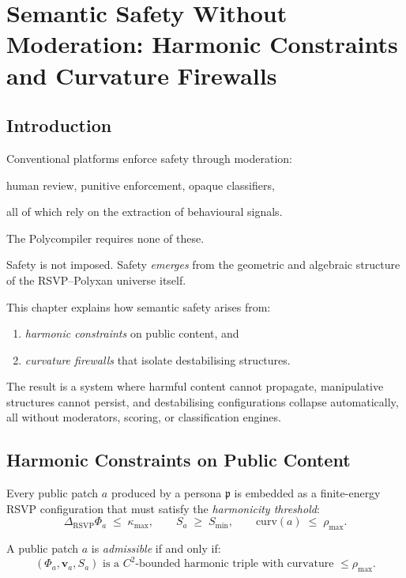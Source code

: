 \chapter{Semantic Safety Without Moderation: Harmonic Constraints and Curvature Firewalls}
\label{ch:safety-firewalls}

\section{Introduction}

Conventional platforms enforce safety through
moderation:
\begin{center}
    human review, punitive enforcement, opaque classifiers,
\end{center}
all of which rely on the extraction of behavioural signals.

The Polycompiler requires none of these.

Safety is not imposed.  
Safety \emph{emerges} from the geometric and algebraic structure of the RSVP--Polyxan universe itself.

This chapter explains how semantic safety arises from:
\begin{enumerate}
    \item \emph{harmonic constraints} on public content, and
    \item \emph{curvature firewalls} that isolate destabilising structures.
\end{enumerate}

The result is a system where harmful content cannot propagate,
manipulative structures cannot persist,
and destabilising configurations collapse automatically,
all without moderators, scoring, or classification engines.

\section{Harmonic Constraints on Public Content}

Every public patch $a$ produced by a persona $\mathfrak{p}$
is embedded as a finite-energy RSVP configuration
that must satisfy the \emph{harmonicity threshold}:
\[
\Delta_{\mathrm{RSVP}} \Phi_a \;\le\; \kappa_{\max},
\qquad
S_a \;\ge\; S_{\mathrm{min}},
\qquad
\mathrm{curv}(a) \;\le\; \rho_{\max}.
\]

\begin{definition}
A public patch $a$ is \emph{admissible} if and only if:
\[
(\Phi_a, \mathbf{v}_a, S_a)
\text{ is a } C^2\text{-bounded harmonic triple
with curvature } \le \rho_{\max}.
\]
\end{definition}

